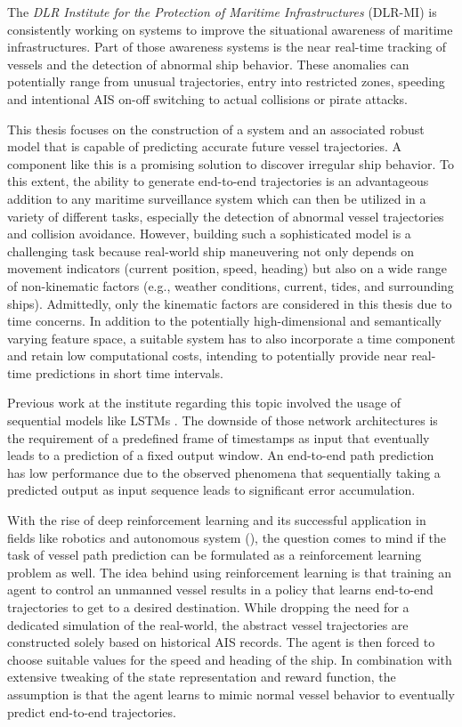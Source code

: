 The \textit{DLR Institute for the Protection of Maritime Infrastructures} (DLR-MI) is consistently working on systems to improve the situational awareness of maritime infrastructures. Part of those awareness systems is the near real-time tracking of vessels and the detection of abnormal ship behavior. These anomalies can potentially range from unusual trajectories, entry into restricted zones, speeding and intentional AIS on-off switching to actual collisions or pirate attacks.
\par
This thesis focuses on the construction of a system and an associated robust model that is capable of predicting accurate future vessel trajectories. A component like this is a promising solution to discover irregular ship behavior. To this extent, the ability to generate end-to-end trajectories is an advantageous addition to any maritime surveillance system which can then be utilized in a variety of different tasks, especially the detection of abnormal vessel trajectories and collision avoidance.
However, building such a sophisticated model is a challenging task because real-world ship maneuvering not only depends on movement indicators (current position, speed, heading) but also on a wide range of non-kinematic factors (e.g., weather conditions, current, tides, and surrounding ships). Admittedly, only the kinematic factors are considered in this thesis due to time concerns. In addition to the potentially high-dimensional and semantically varying feature space, a suitable system has to also incorporate a time component and retain low computational costs, intending to potentially provide near real-time predictions in short time intervals.
\par
Previous work at the institute regarding this topic involved the usage of sequential models like LSTMs \cite[]{hochreiter1997long}. The downside of those network architectures is the requirement of a predefined frame of timestamps as input that eventually leads to a prediction of a fixed output window. An end-to-end path prediction has low performance due to the observed phenomena that sequentially taking a predicted output as input sequence leads to significant error accumulation.
\par
With the rise of deep reinforcement learning and its successful application in fields like robotics and autonomous system (\cite{s18092905, zare2021continuous, 9195789, martinsen2018curved}), the question comes to mind if the task of vessel path prediction can be formulated as a reinforcement learning problem as well. The idea behind using reinforcement learning is that training an agent to control an unmanned vessel results in a policy that learns end-to-end trajectories to get to a desired destination. While dropping the need for a dedicated simulation of the real-world, the abstract vessel trajectories are constructed solely based on historical AIS records. The agent is then forced to choose suitable values for the speed and heading of the ship. In combination with extensive tweaking of the state representation and reward function, the assumption is that the agent learns to mimic normal vessel behavior to eventually predict end-to-end trajectories.
